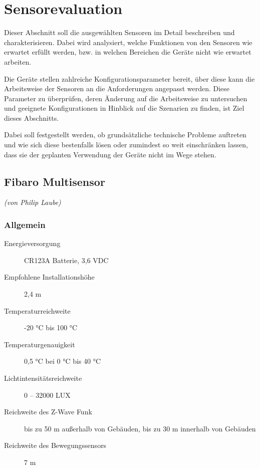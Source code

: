 \section{Sensorevaluation}
Dieser Abschnitt soll die ausgewählten Sensoren im Detail beschreiben und charakterisieren. Dabei wird analysiert, welche Funktionen von den Sensoren wie erwartet erfüllt werden, bzw. in welchen Bereichen die Geräte nicht wie erwartet arbeiten.

Die Geräte stellen zahlreiche Konfigurationsparameter bereit, über diese kann die Arbeitsweise der Sensoren an die Anforderungen angepasst werden. Diese Parameter zu überprüfen, deren Änderung auf die Arbeitsweise zu untersuchen und geeignete Konfigurationen in Hinblick auf die Szenarien zu finden, ist Ziel dieses Abschnitts.

Dabei soll festgestellt werden, ob grundsätzliche technische Probleme auftreten und wie sich diese bestenfalls lösen oder zumindest so weit einschränken lassen, dass sie der geplanten Verwendung der Geräte nicht im Wege stehen.


\subsection{Fibaro Multisensor}
\emph{(von Philip Laube)}

\subsubsection{Allgemein}

\begin{description}
	\item[Energieversorgung] CR123A Batterie, 3,6 VDC
	\item[Empfohlene Installationshöhe] 2,4 m
	\item[Temperaturreichweite] -20 °C bis 100 °C
	\item[Temperaturgenauigkeit] 0,5 °C bei 0 °C bis 40 °C
	\item[Lichtintensitätsreichweite] 0 – 32000 LUX
	\item[Reichweite des Z-Wave Funk] bis zu 50 m außerhalb von Gebäuden, bis zu 30 m innerhalb von Gebäuden
	\item[Reichweite des Bewegungssensors] 7 m
\end{description}

